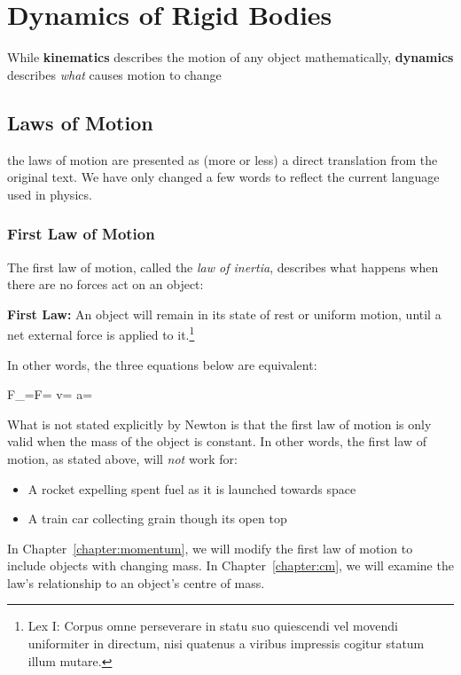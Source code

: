 \chapter{Dynamics of Rigid Bodies}
\label{chapter:dynamics}

While \textbf{kinematics} describes the motion of any object mathematically,
\textbf{dynamics} describes \emph{what} causes motion to change


\section{Laws of Motion}

the laws of motion are presented as (more or less) a direct translation from
the original text. We have only changed a few words to reflect the current
language used in physics.

\subsection{First Law of Motion}

The first law of motion, called the \emph{law of inertia}, describes what
happens when there are no forces act on an object:

\begin{definition}
  \textbf{First Law:} An object will remain in its state of rest or uniform
  motion, until a net external force is applied to it.\footnote{Lex I:
  Corpus omne perseverare in statu suo quiescendi vel movendi uniformiter
  in directum, nisi quatenus a viribus impressis cogitur statum illum
  mutare.}
\end{definition}
In other words, the three equations below are equivalent:
\begin{important-equation}
  \bm F_=\sum\bm F=
  \quad\longleftrightarrow\quad
  \bm v=
  \quad\longleftrightarrow\quad
  \bm a=
\end{important-equation}

What is not stated explicitly by Newton is that the first law of motion is only
valid when the mass of the object is constant. In other words, the first law of
motion, as stated above, will \emph{not} work for:
\begin{itemize}[itemsep=6pt]
\item A rocket expelling spent fuel as it is launched towards space
\item A train car collecting grain though its open top
\end{itemize}
In Chapter~\ref{chapter:momentum}, we will modify the first law of motion
to include objects with changing mass. In Chapter~\ref{chapter:cm}, we will
examine the law's relationship to an object's centre of mass.

